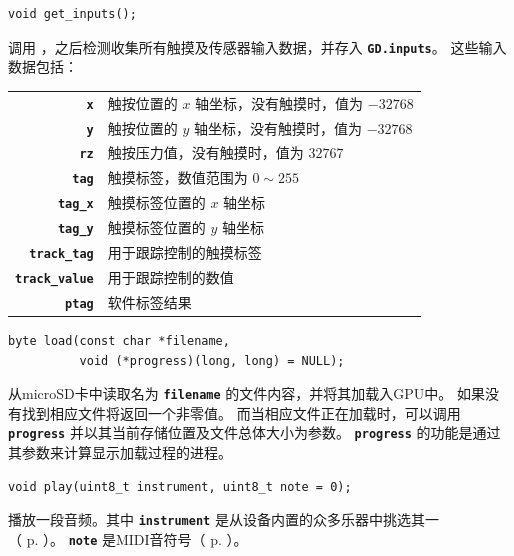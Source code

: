 \documentclass[10pt]{book}
\newcommand{\mach}[1]{\texttt{\textbf{#1}}}
\begin{document}
\begin{CJK}{UTF8}{gkai}

\begin{framed}
\begin{verbatim}
void get_inputs();
\end{verbatim}
\end{framed}

调用  ，之后检测收集所有触摸及传感器输入数据，并存入 \mach{GD.inputs}。
这些输入数据包括：

\vspace{10pt}
\begin{tabular}{rl}
\mach{x} & 触按位置的 $x$ 轴坐标，没有触摸时，值为 $-32768$ \\
\mach{y} & 触按位置的 $y$ 轴坐标，没有触摸时，值为 $-32768$ \\
\mach{rz} & 触按压力值，没有触摸时，值为 $32767$ \\
\mach{tag} & 触摸标签，数值范围为 $0\sim255$ \\
\mach{tag\_x} & 触摸标签位置的 $x$ 轴坐标 \\
\mach{tag\_y} & 触摸标签位置的 $y$ 轴坐标 \\
\mach{track\_tag} & 用于跟踪控制的触摸标签 \\
\mach{track\_value} & 用于跟踪控制的数值\\
\mach{ptag} & 软件标签结果 \\
\end{tabular}


\begin{framed}
\begin{verbatim}
byte load(const char *filename,
          void (*progress)(long, long) = NULL);
\end{verbatim}
\end{framed}

从microSD卡中读取名为 \mach{filename} 的文件内容，并将其加载入GPU中。
如果没有找到相应文件将返回一个非零值。
而当相应文件正在加载时，可以调用 \mach{progress} 并以其当前存储位置及文件总体大小为参数。
\mach{progress} 的功能是通过其参数来计算显示加载过程的进程。


\begin{framed}
\begin{verbatim}
void play(uint8_t instrument, uint8_t note = 0);
\end{verbatim}
\end{framed}

播放一段音频。其中 \mach{instrument} 是从设备内置的众多乐器中挑选其一\\
（ p. \pageref{instruments} ）。
\mach{note} 是MIDI音符号（ p. \pageref{MIDI} ）。


\end{CJK}
\end{document}
